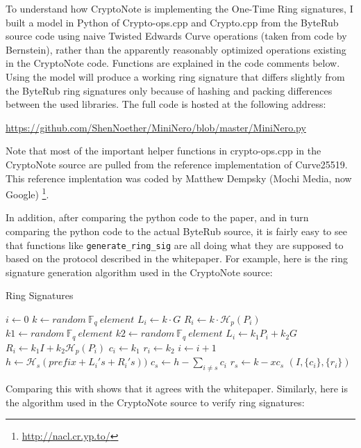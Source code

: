 \documentclass[12pt,english]{mrl}
\numberwithin{equation}{section}
\numberwithin{figure}{section}
\begin{document}
To understand how CryptoNote is implementing the One-Time Ring signatures,
I built a model in Python of Crypto-ops.cpp and Crypto.cpp from the ByteRub source
code using naive Twisted Edwards Curve operations (taken
from code by Bernstein), rather than the apparently reasonably optimized
operations existing in the CryptoNote code. Functions
are explained in the code comments below. Using the model will produce
a working ring signature that differs slightly from the ByteRub ring
signatures only because of hashing and packing differences between
the used libraries. The full code is hosted at the following address: 
\begin{center}
\url{https://github.com/ShenNoether/MiniNero/blob/master/MiniNero.py}
\end{center}
Note that most of the important helper functions in crypto-ops.cpp in the CryptoNote source
are pulled from the reference implementation of Curve25519. This reference
implentation was coded by Matthew Dempsky (Mochi Media, now Google)%
\footnote{\url{http://nacl.cr.yp.to/}%
}. 

In addition, after comparing the python code to the paper, and in
turn comparing the python code to the actual ByteRub source, it is
fairly easy to see that functions like \texttt{generate\_ring\_sig} are
all doing what they are supposed to based on the protocol described
in the whitepaper. For example, here is the ring signature generation algorithm
used in the CryptoNote source:

\begin{algorithm}[H]
\caption{Ring Signatures}


\begin{algorithmic} 
\State $i\gets 0$
		\State $k \gets random\ \mathbb{F}_q\  element$       
		\State $L_i \gets k \cdot G$
		\State $R_i \gets k\cdot \mathcal{H}_p(P_i)$
	\Else
		\State $k1 \gets random\ \mathbb{F}_q\  element$
		\State $k2 \gets random\ \mathbb{F}_q\  element$
		\State $L_i\gets k_1 P_i + k_2  G$
		\State $R_i\gets k_1 I+k_2 \mathcal{H}_p(P_i)$
		\State $c_i \gets k_1$
		\State $r_i \gets k_2$
	\EndIf 
	\State $i \gets i+1$
\EndWhile
\State $h \gets \mathcal{H}_s(prefix+L_i's+R_i's))$
\State $c_{s} \gets h-\sum_{i\neq s} c_i$
\State $r_s \gets k - x c_s$
\State \Return $(I, \{c_{i}\}, \{r_i\})$
\end{algorithmic} 
\end{algorithm}


Comparing this with \cite{CN} shows that it agrees with the whitepaper.
Similarly, here is the algorithm used in the CryptoNote source
to verify ring signatures:
\end{document}
